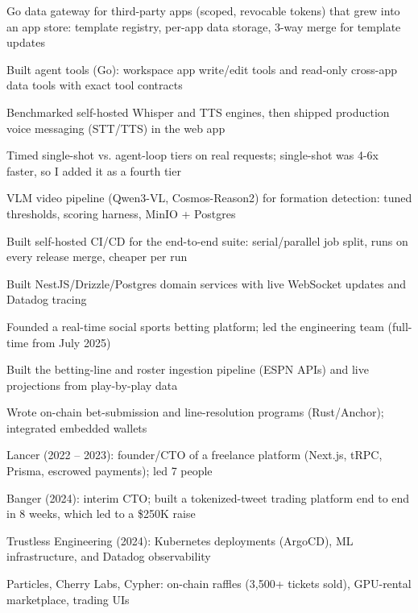 \documentclass[print]{jack-resume}
\begin{document}
\begin{tightemize}
    \item Go data gateway for third-party apps (scoped, revocable tokens) that grew into an app store: template registry, per-app data storage, 3-way merge for template updates
    \item Built agent tools (Go): workspace app write/edit tools and read-only cross-app data tools with exact tool contracts
    \item Benchmarked self-hosted Whisper and TTS engines, then shipped production voice messaging (STT/TTS) in the web app
    \item Timed single-shot vs. agent-loop tiers on real requests; single-shot was 4-6x faster, so I added it as a fourth tier
    \item VLM video pipeline (Qwen3-VL, Cosmos-Reason2) for formation detection: tuned thresholds, scoring harness, MinIO + Postgres
    \item Built self-hosted CI/CD for the end-to-end suite: serial/parallel job split, runs on every release merge, cheaper per run
\end{tightemize}
\sectionsep

\begin{tightemize}
    \item Built NestJS/Drizzle/Postgres domain services with live WebSocket updates and Datadog tracing
    \item Founded a real-time social sports betting platform; led the engineering team (full-time from July 2025)
    \item Built the betting-line and roster ingestion pipeline (ESPN APIs) and live projections from play-by-play data
    \item Wrote on-chain bet-submission and line-resolution programs (Rust/Anchor); integrated embedded wallets
\end{tightemize}
\sectionsep

\begin{tightemize}
    \item Lancer (2022 – 2023): founder/CTO of a freelance platform (Next.js, tRPC, Prisma, escrowed payments); led 7 people
    \item Banger (2024): interim CTO; built a tokenized-tweet trading platform end to end in 8 weeks, which led to a \$250K raise
    \item Trustless Engineering (2024): Kubernetes deployments (ArgoCD), ML infrastructure, and Datadog observability
    \item Particles, Cherry Labs, Cypher: on-chain raffles (3,500+ tickets sold), GPU-rental marketplace, trading UIs
\end{tightemize}
\sectionsep
\end{document}
